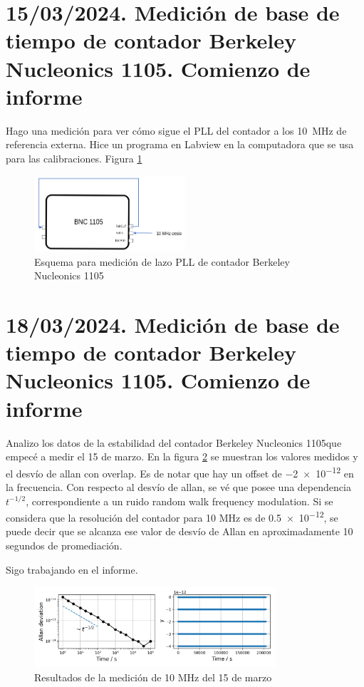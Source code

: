 \documentclass[11pt]{article}
\newcommand{\BNC}[0]{Berkeley Nucleonics 1105}
\begin{document}
\section{15/03/2024. Medición de base de tiempo de contador \BNC. Comienzo de informe}

Hago una medición para ver cómo sigue el PLL del contador a los \SI{10}{\mega\hertz} de referencia externa. Hice un programa en Labview en la computadora que se usa para las calibraciones. Figura \ref{fig:BNC10MHz}

\begin{figure}[ht]
    \begin{center}
        \includegraphics[width=0.5\textwidth]{./figuras/esquemaBNC.png}
        \caption{Esquema para medición de lazo PLL de contador \BNC}
        \label{fig:BNC10MHz}
    \end{center}
\end{figure}

\newpage
\section{18/03/2024. Medición de base de tiempo de contador \BNC. Comienzo de informe}

Analizo los datos de la estabilidad del contador \BNC que empecé a medir el 15 de marzo. En la figura \ref{fig:BNC10MHz_allan} se muestran los valores medidos y el desvío de allan con overlap. Es de notar que hay un offset de \SI{-2e-12}{} en la frecuencia. Con respecto al desvío de allan, se vé que posee una dependencia $t^{-1/2}$, correspondiente a un ruido random walk frequency modulation. Si se considera que la resolución del contador para 10 MHz es de \SI{0.5e-12}{}, se puede decir que se alcanza ese valor de desvío de Allan en aproximadamente 10 segundos de promediación. 

Sigo trabajando en el informe.

\begin{figure}[ht]
    \begin{center}
        \includegraphics[width=0.8\textwidth]{./figuras/BNC10MHz_oadev.png}
        \caption{Resultados de la medición de 10 MHz del 15 de marzo}
        \label{fig:BNC10MHz_allan}
    \end{center}
\end{figure}
\end{document}
